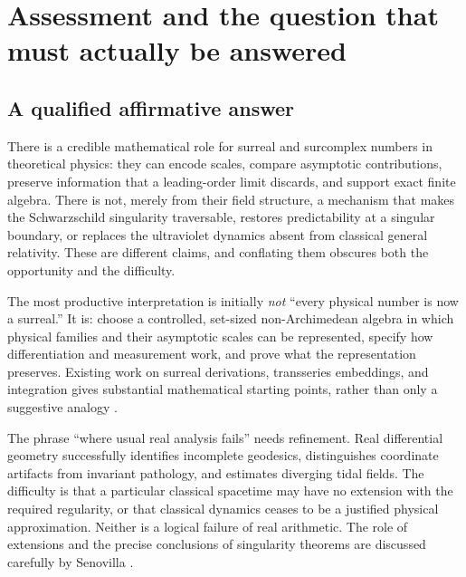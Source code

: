 \documentclass[11pt,a4paper]{article}
\numberwithin{equation}{section}
\theoremstyle{definition}
\theoremstyle{remark}
\begin{document}
\section{Assessment and the question that must actually be answered}
\label{sec:assessment}

\subsection{A qualified affirmative answer}
There is a credible mathematical role for surreal and surcomplex numbers in theoretical physics: they can encode scales, compare asymptotic contributions, preserve information that a leading-order limit discards, and support exact finite algebra. There is not, merely from their field structure, a mechanism that makes the Schwarzschild singularity traversable, restores predictability at a singular boundary, or replaces the ultraviolet dynamics absent from classical general relativity. These are different claims, and conflating them obscures both the opportunity and the difficulty.

The most productive interpretation is initially \emph{not} ``every physical number is now a surreal.'' It is: choose a controlled, set-sized non-Archimedean algebra in which physical families and their asymptotic scales can be represented, specify how differentiation and measurement work, and prove what the representation preserves. Existing work on surreal derivations, transseries embeddings, and integration gives substantial mathematical starting points, rather than only a suggestive analogy \cite{BM,ADH,CE}.

The phrase ``where usual real analysis fails'' needs refinement. Real differential geometry successfully identifies incomplete geodesics, distinguishes coordinate artifacts from invariant pathology, and estimates diverging tidal fields. The difficulty is that a particular classical spacetime may have no extension with the required regularity, or that classical dynamics ceases to be a justified physical approximation. Neither is a logical failure of real arithmetic. The role of extensions and the precise conclusions of singularity theorems are discussed carefully by Senovilla \cite{Senovilla}.
\end{document}
